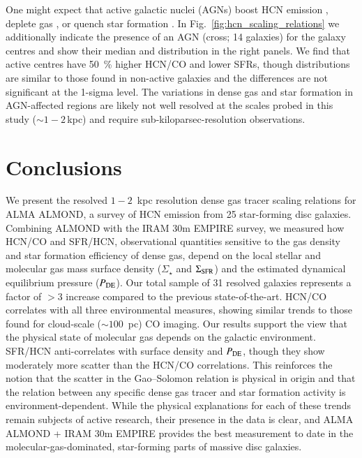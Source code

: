 \documentclass[letter, longauth]{aa} %
\begin{document}
One might expect that active galactic nuclei (AGNs) boost HCN emission \citep[e.g.][]{Goldsmith2018, Matsushita2015}, deplete gas \citep[e.g.][]{Ellison2021}, or quench star formation \citep[e.g.][]{Nelson2019}.
In Fig.~\ref{fig:hcn_scaling_relations} we additionally indicate the presence of an AGN (cross; 14 galaxies) for the galaxy centres and show their median and distribution in the right panels.
We find that active centres have \SI{50}{\percent} higher HCN/CO and lower SFRs, though distributions are similar to those found in non-active galaxies and the differences are not significant at the 1-sigma level.
The variations in dense gas and star formation in AGN-affected regions are likely not well resolved at the scales probed in this study  ($\sim 1-2\,$kpc) and require sub-kiloparsec-resolution observations.


\section{Conclusions}
\label{sec:conclusions}

We present the resolved $1{-}2$~kpc resolution dense gas tracer scaling relations for ALMA ALMOND, a survey of HCN emission from 25 star-forming disc galaxies. 
Combining ALMOND with the IRAM 30m EMPIRE survey, we measured how HCN/CO and SFR/HCN, observational quantities sensitive to the gas density and star formation efficiency of dense gas, depend on the local stellar and molecular gas mass surface density ($\Sigma_\star$ and $\Sigma_{\rm SFR}$) and the estimated dynamical equilibrium pressure ($P_{\rm DE}$). 
Our total sample of 31 resolved galaxies represents a factor of $>3$ increase compared to the previous state-of-the-art. 
HCN/CO correlates with all three environmental measures, showing similar trends to those found for cloud-scale ($\sim 100$~pc) CO imaging. 
Our results support the view that the physical state of molecular gas depends on the galactic environment. SFR/HCN anti-correlates with surface density and $P_{\rm DE}$, though they show moderately more scatter than the HCN/CO correlations. This reinforces the notion that the scatter in the Gao--Solomon relation is physical in origin and that the relation between any specific dense gas tracer and star formation activity is environment-dependent. While the physical explanations for each of these trends remain subjects of active research, their presence in the data is clear, and ALMA ALMOND + IRAM 30m EMPIRE provides the best measurement to date in the molecular-gas-dominated, star-forming parts of massive disc galaxies.
\end{document}
